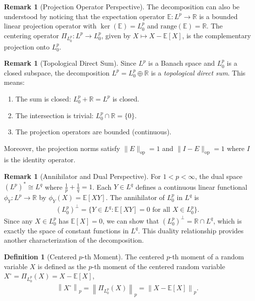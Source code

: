 \documentclass[11pt,reqno]{amsart}
\theoremstyle{definition}
\newtheorem{definition}[theorem]{Definition}
\newtheorem{remark}[theorem]{Remark}
\theoremstyle{remark}
\begin{document}
\begin{remark}[Projection Operator Perspective]
	The decomposition can also be understood by noticing that the expectation operator \(\mathbb{E}: L^p \to \mathbb{R}\) is a bounded linear projection operator with \(\ker(\mathbb{E}) = L^p_0\) and \(\text{range}(\mathbb{E}) = \mathbb{R}\). The centering operator \(\Pi_{L^p_0}: L^p \to L^p_0\), given by \(X \mapsto X - \mathbb{E}[X]\), is the complementary projection onto \(L^p_0\).
\end{remark}

\begin{remark}[Topological Direct Sum]
	Since \(L^p\) is a Banach space and \(L^p_0\) is a closed subspace, the decomposition \(L^p = L^p_0 \oplus \mathbb{R}\) is a \emph{topological direct sum}. This means:
	\begin{enumerate}[label=(\roman*)]
		\item The sum is closed: \(L^p_0 + \mathbb{R} = L^p\) is closed.
		\item The intersection is trivial: \(L^p_0 \cap \mathbb{R} = \{0\}\).
		\item The projection operators are bounded (continuous).
	\end{enumerate}
	Moreover, the projection norms satisfy $\|E\|_{\text{op}} = 1$ and $\|I - E\|_{\text{op}} = 1$ where $I$ is the identity operator.
\end{remark}

\begin{remark}[Annihilator and Dual Perspective]
	For $1 < p < \infty$, the dual space $(L^p)^* \cong L^q$ where $\frac{1}{p} + \frac{1}{q} = 1$. Each $Y \in L^q$ defines a continuous linear functional $\phi_Y: L^p \to \mathbb{R}$ by $\phi_Y(X) = \mathbb{E}[XY]$. The annihilator of $L^p_0$ in $L^q$ is
	\begin{align*}
		(L^p_0)^\perp = \{Y \in L^q : \mathbb{E}[XY] = 0 \text{ for all } X \in L^p_0\}.
	\end{align*}
	Since any $X \in L^p_0$ has $\mathbb{E}[X] = 0$, we can show that $(L^p_0)^\perp = \mathbb{R} \cap L^q$, which is exactly the space of constant functions in $L^q$. This duality relationship provides another characterization of the decomposition.
\end{remark}

\begin{definition}[Centered \(p\)-th Moment]
	The centered \(p\)-th moment of a random variable \(X\) is defined as the \(p\)-th moment of the centered random variable \(X^\circ = \Pi_{L^p_0}(X) = X - \mathbb{E}[X]\),
	\begin{align*}
		\left \| X^\circ \right \|_p =
		\left \| \Pi_{L^p_0}(X) \right\|_p = \left \| X - \mathbb{E}[X] \right\|_p .
	\end{align*}
\end{definition}
\end{document}
